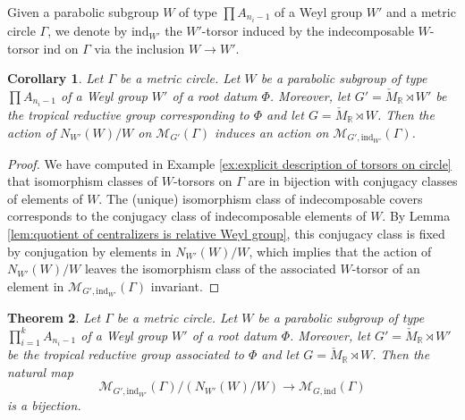 \documentclass[10pt, a4paper]{amsart}
\newtheorem{theorem}{Theorem}[section]
\newtheorem{corollary}[theorem]{Corollary}
\theoremstyle{definition}
\theoremstyle{myitemstyle}
\newcommand{\R}{\mathbb{R}}
\newcommand{\Mcheck}{{\check{M}}}
\newcommand{\mc}[1]{{\mathcal{#1}}}
\newcommand{\ind}{\mathrm{ind}}
\newcommand{\Ga}{\Gamma}
\begin{document}
Given a parabolic subgroup $W$ of type $\prod A_{n_i-1}$ of a Weyl group $W'$ and a metric circle $\Gamma$, we denote by $\ind_{W'}$ the $W'$-torsor induced by the indecomposable $W$-torsor $\ind$ on $\Gamma$ via the inclusion $W\to W'$.

\begin{corollary} Let $\Gamma$ be a metric circle. Let $W$ be a parabolic subgroup of type $\prod A_{n_i-1}$ of a Weyl group $W'$ of a root datum $\Phi$. Moreover, let $G'=\Mcheck_\R \rtimes W'$ be the tropical reductive group corresponding to $\Phi$ and let $G=\Mcheck_\R \rtimes W$.  Then the action of $N_{W'}(W)/W$ on $\mc M_{G'}(\Gamma)$ induces an action on $\mc M_{G',\ind_{W'}}(\Ga)$.
\end{corollary}

\begin{proof}
We have computed in Example \ref{ex:explicit description of torsors on circle} that isomorphism classes of $W$-torsors on $\Gamma$ are in bijection with conjugacy classes of elements of $W$. The (unique) isomorphism class of indecomposable covers corresponds to the conjugacy class of indecomposable elements of $W$. By Lemma \ref{lem:quotient of centralizers is relative Weyl group}, this conjugacy class is fixed by conjugation by elements in $N_{W'}(W)/W$,  which implies that the action of $N_{W'}(W)/W$ leaves the isomorphism class of the associated $W$-torsor of an element in $\mc M_{G',\ind_{W'}}(\Ga)$ invariant. 
\end{proof}



\begin{theorem}
\label{thm:tropical semistable bundles are quotients of stable ones}
Let $\Gamma$ be a metric circle. Let $W$ be a parabolic subgroup of type $\prod_{i=1}^k A_{n_i-1}$ of a Weyl group $W'$ of a root datum $\Phi$. Moreover, let $G'= \Mcheck_\R \rtimes W'$ be the tropical reductive group associated to $\Phi$ and let $G= \Mcheck_\R \rtimes W$. Then the natural map
\[
    \mc M_{G',\ind_{W'}}(\Ga)/(N_{W'}(W)/W)\longrightarrow  \mc M_{G,\ind}(\Ga)
\]
is a bijection.
\end{theorem}
\end{document}
